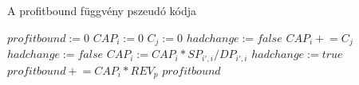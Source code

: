 \begin{algorithm}[H]
\caption{A profitbound függvény pszeudó kódja}
\label{profitbound}
\begin{algorithmic}[1]
	\State $profitbound:= 0$
	\State $CAP_{i}:= 0$
	\State $C_{j}:= 0$
	\State $hadchange:= false$
			\State $CAP_{i} \mathrel{+}= C_{j}$			
		\EndFor
	\EndFor
		\State $hadchange:= false$
					\State $CAP_{i}:= CAP_{i}*SP_{i',i}/DP_{i',i}$
					\State $hadchange:= true$
				\EndIf
			\EndFor	
		\EndFor
	\EndWhile
				\State $profitbound \mathrel{+}= CAP_{i}*REV_{p}$
			\EndIf
		\EndFor
	\EndFor
	\State \Return $profitbound$
\EndProcedure
\end{algorithmic}
\end{algorithm}